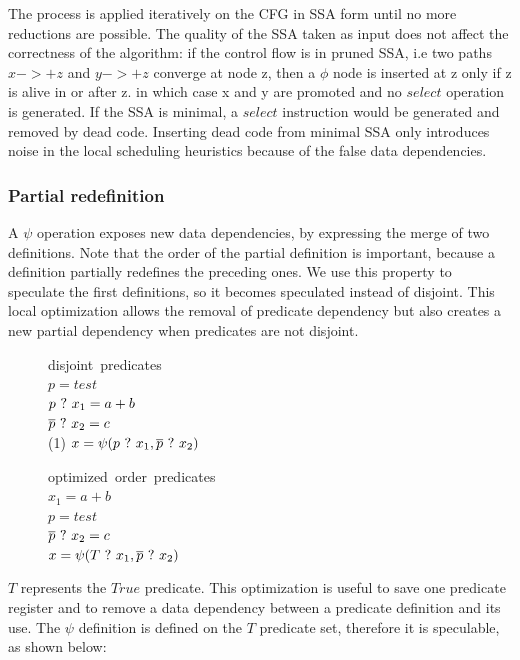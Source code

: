 The process is applied iteratively on the CFG in SSA form until no more reductions are possible. The quality of the SSA taken as input does not affect the correctness of the algorithm: if the control flow is in pruned SSA, i.e two paths $x->+z$ and $y->+z$ converge at node z, then a $\phi$ node is inserted at z only if z is alive in or after z. in which case x and y are promoted and no $select$ operation is generated. If the SSA is minimal, a $select$ instruction would be generated and removed by dead code. Inserting dead code from minimal SSA only introduces noise in the local scheduling heuristics because of the false data dependencies.

\subsubsection{Partial redefinition}

A $\psi$ operation exposes new data dependencies, by expressing the merge of two definitions. Note that the order of the partial definition is important, because a definition partially redefines the preceding ones. We use this property to speculate the first definitions, so it becomes speculated instead of disjoint. This local optimization allows the removal of predicate dependency but also creates a new partial dependency when predicates are not disjoint. 

\begin{figure}
\footnotesize
\begin{minipage}[t]{4cm}
\mbox{disjoint predicates} \\
$ p = test $ \\
$ p ~?~ x_1 = a + b $ \\
$ \overline{p} ~?~ x_2 = c $ \\
(1) $ x = \psi(p ~?~ x_1, \overline{p} ~?~ x_2) $ \\
\end{minipage}
\begin{minipage}[t]{4cm}
\mbox{optimized order predicates} \\
$ x_1 = a + b $ \\
$ p = test $ \\
$ \overline{p} ~?~ x_2 = c $ \\
$ x = \psi(T ~?~ x_1, \overline{p} ~?~ x_2) $ \\
\end{minipage}
\end{figure}

$T$ represents the $True$ predicate. This optimization is useful to save one predicate register and to remove a data dependency between a predicate definition and its use. 
The $\psi$ definition is defined on the $T$ predicate set, therefore it is speculable, as shown below:

